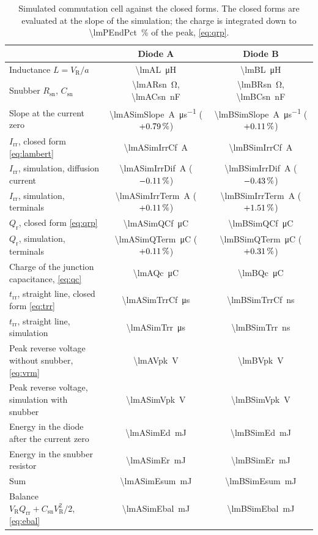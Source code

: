 \documentclass[10pt,a4paper]{scrartcl}
\newcommand{\VR}{V_\mathrm{R}}
\newcommand{\Irr}{I_\mathrm{rr}}
\newcommand{\Qrr}{Q_\mathrm{rr}}
\newcommand{\trr}{t_\mathrm{rr}}
\newcommand{\Csn}{C_\mathrm{sn}}
\newcommand{\Rsn}{R_\mathrm{sn}}
\begin{document}
\begin{table}[htb]
\centering\small
\caption{Simulated commutation cell against the closed forms. The closed forms are evaluated at the slope of the simulation; the charge is integrated down to \SI{\lmPEndPct}{\percent} of the peak, \eqref{eq:qrp}.}
\label{tab:cell}
\begin{tabular}{@{}lcc@{}}
\toprule
 & Diode A & Diode B \\
\midrule
Inductance $L = \VR/a$ & \SI{\lmAL}{\micro\henry} & \SI{\lmBL}{\micro\henry} \\
Snubber $\Rsn$, $\Csn$ & \SI{\lmARsn}{\ohm}, \SI{\lmACsn}{\nano\farad} & \SI{\lmBRsn}{\ohm}, \SI{\lmBCsn}{\nano\farad} \\
Slope at the current zero & \SI{\lmASimSlope}{\ampere\per\micro\second} ($+0.79\,\%$) & \SI{\lmBSimSlope}{\ampere\per\micro\second} ($+0.11\,\%$) \\
\addlinespace
$\Irr$, closed form \eqref{eq:lambert} & \SI{\lmASimIrrCf}{\ampere} & \SI{\lmBSimIrrCf}{\ampere} \\
$\Irr$, simulation, diffusion current & \SI{\lmASimIrrDif}{\ampere} ($-0.11\,\%$) & \SI{\lmBSimIrrDif}{\ampere} ($-0.43\,\%$) \\
$\Irr$, simulation, terminals & \SI{\lmASimIrrTerm}{\ampere} ($+0.11\,\%$) & \SI{\lmBSimIrrTerm}{\ampere} ($+1.51\,\%$) \\
\addlinespace
$Q_\mathrm{r}$, closed form \eqref{eq:qrp} & \SI{\lmASimQCf}{\micro\coulomb} & \SI{\lmBSimQCf}{\micro\coulomb} \\
$Q_\mathrm{r}$, simulation, terminals & \SI{\lmASimQTerm}{\micro\coulomb} ($+0.11\,\%$) & \SI{\lmBSimQTerm}{\micro\coulomb} ($+0.31\,\%$) \\
Charge of the junction capacitance, \eqref{eq:qc} & \SI{\lmAQc}{\micro\coulomb} & \SI{\lmBQc}{\micro\coulomb} \\
\addlinespace
$\trr$, straight line, closed form \eqref{eq:trr} & \SI{\lmASimTrrCf}{\micro\second} & \SI{\lmBSimTrrCf}{\nano\second} \\
$\trr$, straight line, simulation & \SI{\lmASimTrr}{\micro\second} & \SI{\lmBSimTrr}{\nano\second} \\
\addlinespace
Peak reverse voltage without snubber, \eqref{eq:vrm} & \SI{\lmAVpk}{\volt} & \SI{\lmBVpk}{\volt} \\
Peak reverse voltage, simulation with snubber & \SI{\lmASimVpk}{\volt} & \SI{\lmBSimVpk}{\volt} \\
Energy in the diode after the current zero & \SI{\lmASimEd}{\milli\joule} & \SI{\lmBSimEd}{\milli\joule} \\
Energy in the snubber resistor & \SI{\lmASimEr}{\milli\joule} & \SI{\lmBSimEr}{\milli\joule} \\
Sum & \SI{\lmASimEsum}{\milli\joule} & \SI{\lmBSimEsum}{\milli\joule} \\
Balance $\VR\Qrr + \Csn\VR^2/2$, \eqref{eq:ebal} & \SI{\lmASimEbal}{\milli\joule} & \SI{\lmBSimEbal}{\milli\joule} \\
\bottomrule
\end{tabular}
\end{table}
\end{document}
